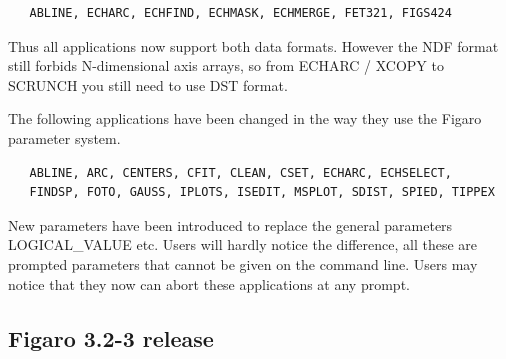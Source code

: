 \begin{verbatim}
   ABLINE, ECHARC, ECHFIND, ECHMASK, ECHMERGE, FET321, FIGS424
\end{verbatim}

   Thus all applications now support both data formats.  However the NDF
   format still forbids N-dimensional axis arrays, so from ECHARC /
   XCOPY to SCRUNCH you still need to use DST format.

   The following applications have been changed in the way they use the
   Figaro parameter system.

\begin{verbatim}
   ABLINE, ARC, CENTERS, CFIT, CLEAN, CSET, ECHARC, ECHSELECT,
   FINDSP, FOTO, GAUSS, IPLOTS, ISEDIT, MSPLOT, SDIST, SPIED, TIPPEX
\end{verbatim}

   New parameters have been introduced to replace the general parameters
   LOGICAL\_VALUE etc.  Users will hardly notice the difference, all
   these are prompted parameters that cannot be given on the command
   line. Users may notice that they now can abort these applications at
   any prompt.


\subsection{\label{news323}Figaro 3.2-3 release}

